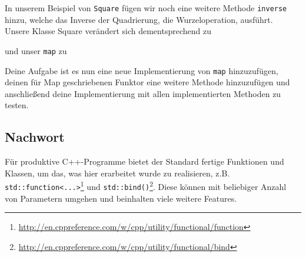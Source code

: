 In unserem Beispiel von \lstinline{Square} fügen wir noch eine weitere Methode \lstinline{inverse} hinzu, welche das Inverse der Quadrierung, die Wurzeloperation, ausführt. \\

Unsere Klasse Square verändert sich dementsprechend zu



und unser \lstinline{map} zu 



Deine Aufgabe ist es nun eine neue Implementierung von \lstinline{map} hinzuzufügen, deinen für Map geschriebenen Funktor eine weitere Methode hinzuzufügen und anschließend deine Implementierung mit allen implementierten Methoden zu testen.

\subsection*{Nachwort}
Für produktive C++-Programme bietet der Standard fertige Funktionen und Klassen, um das, was hier erarbeitet wurde zu realisieren, z.B. \lstinline{std::function<...>}\footnote{\url{http://en.cppreference.com/w/cpp/utility/functional/function}} und \lstinline{std::bind()}\footnote{\url{http://en.cppreference.com/w/cpp/utility/functional/bind}}.
Diese können mit beliebiger Anzahl von Parametern umgehen und beinhalten viele weitere Features.
